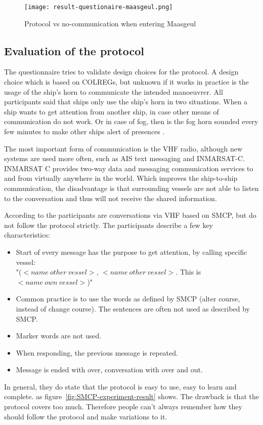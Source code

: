 \begin{figure}[p]
	\centering
	\texttt{[image: result-questionaire-maasgeul.png]}
	\caption{Protocol vs no-communication when entering Maasgeul}
	\label{fig:sq-maasgeul}
\end{figure}


\subsection{Evaluation of the protocol}
The questionnaire tries to validate design choices for the protocol. A design choice which is based on COLREGs, but unknown if it works in practice is the usage of the ship's horn to communicate the intended manoeuvrer. All participants said that ships only use the ship's horn in two situations. When a ship wants to get attention from another ship, in case other means of communication do not work. Or in case of fog, then is the fog horn sounded every few minutes to make other ships alert of presences \cite{IMO1972}.

The most important form of communication is the VHF radio, although new systems are used more often, such as \ac{AIS} text messaging and INMARSAT-C. INMARSAT C provides two-way data and messaging communication services to and from virtually anywhere in the world. Which improves the ship-to-ship communication, the disadvantage is that surrounding vessels are not able to listen to the conversation and thus will not receive the shared information.

According to the participants are conversations via \ac{VHF} based on \ac{SMCP}, but do not follow the protocol strictly. The participants describe a few key characteristics:
\begin{itemize}
	\item Start of every message has the purpose to get attention, by calling specific vessel: \\ "($<name~other~vessel>$, $<name~other~vessel>$. This is $<name~own~vessel>$)"
	\item Common practice is to use the words as defined by \ac{SMCP} (alter course, instead of change course). The sentences are often not used as described by \ac{SMCP}.
	\item Marker words are not used.
	\item When responding, the previous message is repeated.
	\item Message is ended with over, conversation with over and out.
\end{itemize}
In general, they do state that the protocol is easy to use, easy to learn and complete. as figure~\ref{fig:SMCP-experiment-result} shows. The drawback is that the protocol covers too much. Therefore people can't always remember how they should follow the protocol and make variations to it. 

